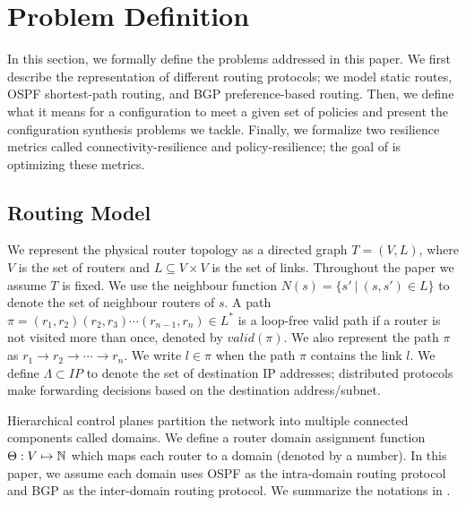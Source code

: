 \section{Problem Definition}
In this section, we formally define the problems addressed in this
paper.  We first describe the representation of different
routing protocols; we model static
routes, OSPF shortest-path routing, and BGP preference-based routing.
Then, we define what it means for a configuration to meet a given
set of policies and present the configuration synthesis problems
we tackle.
Finally, we formalize two resilience metrics called 
connectivity-resilience and policy-resilience; the goal 
of \name is optimizing these metrics. 

\subsection{Routing Model} \label{sec:routingmodel}

We represent the physical router topology as a directed graph $T=(V, L)$,
where $V$ is the set of routers and $L\subseteq V\times V$ is the set of links. 
Throughout the paper we assume $T$ is fixed.
We use the neighbour function $N(s) = \{s'\ | \ (s,s') \in L \}$ to denote 
the set of neighbour routers of $s$. 
A path $\pi = (r_1,r_2) (r_2, r_3) \cdots (r_{n-1}, r_n) \in L^*$ is a 
loop-free valid path if
a router is not visited more than once, denoted by $valid(\pi)$.
We also represent the path $\pi$ as 
$r_1\rightarrow r_2 \rightarrow  \cdots \rightarrow r_n$.
We write $l \in \pi$ when the path $\pi$ contains the link $l$. 
We define $\Lambda \subset IP$ to denote the set of 
destination IP addresses;
distributed protocols make forwarding decisions based on the 
destination address/subnet.

Hierarchical control planes partition the
network into multiple connected components called domains. 
We define a router domain assignment function
$\Theta: V \mapsto \mathbb{N}$ which maps each router to a domain 
(denoted by a number). In this paper, we assume 
each domain uses OSPF as the intra-domain routing protocol
and BGP as the inter-domain routing protocol. We summarize
the notations in . 


